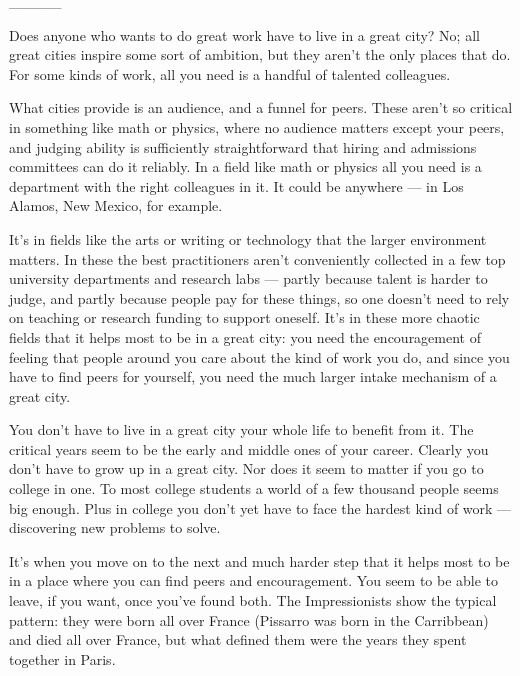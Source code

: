                   \_\_\_\_\_
                  

Does anyone who wants to do great work have to
                  live in a great city? No; all great cities inspire some sort
                  of ambition, but they aren't the only places that do. For some
                  kinds of work, all you need is a handful of talented
                  colleagues.

What cities provide is an audience, and
                  a funnel for peers. These aren't so critical in something like
                  math or physics, where no audience matters except your peers,
                  and judging ability is sufficiently straightforward that
                  hiring and admissions committees can do it reliably. In a
                  field like math or physics all you need is a department with
                  the right colleagues in it. It could be anywhere --- in
                  Los Alamos, New Mexico, for example.

It's in fields
                  like the arts or writing or technology that the larger
                  environment matters. In these the best practitioners aren't
                  conveniently collected in a few top university departments and
                  research labs --- partly because talent is harder to
                  judge, and partly because people pay for these things, so one
                  doesn't need to rely on teaching or research funding to
                  support oneself. It's in these more chaotic fields that it
                  helps most to be in a great city: you need the encouragement
                  of feeling that people around you care about the kind of work
                  you do, and since you have to find peers for yourself, you
                  need the much larger intake mechanism of a great city.

You
                  don't have to live in a great city your whole life to benefit
                  from it. The critical years seem to be the early and middle
                  ones of your career. Clearly you don't have to grow up in a
                  great city. Nor does it seem to matter if you go to college in
                  one. To most college students a world of a few thousand people
                  seems big enough. Plus in college you don't yet have to face
                  the hardest kind of work --- discovering new problems to
                  solve.

It's when you move on to the next and much
                  harder step that it helps most to be in a place where you can
                  find peers and encouragement. You seem to be able to leave, if
                  you want, once you've found both. The Impressionists show the
                  typical pattern: they were born all over France (Pissarro was
                  born in the Carribbean) and died all over France, but what
                  defined them were the years they spent together in Paris.


